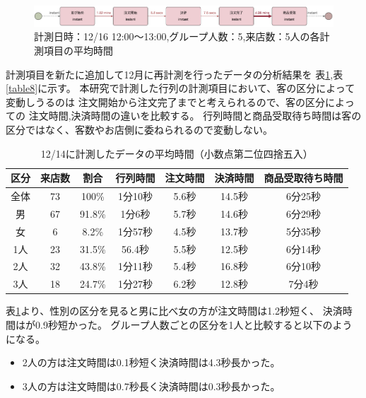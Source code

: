 \documentclass{jsarticle}
\begin{document}
\begin{figure}[H]
  \centering
  \includegraphics[width=15cm]{5-5b.png}
  \caption{計測日時：12/16 12:00〜13:00,グループ人数：5,来店数：5人の各計測項目の平均時間}
  \label{fig:5-5b}
\end{figure}





計測項目を新たに追加して12月に再計測を行ったデータの分析結果を
表\ref{table7},表\ref{table8}に示す。
本研究で計測した行列の計測項目において、客の区分によって変動しうるのは
注文開始から注文完了までと考えられるので、客の区分によっての
注文時間,決済時間の違いを比較する。
行列時間と商品受取待ち時間は客の区分ではなく、客数やお店側に委ねられるので変動しない。

\begin{table}[H]
 \begin{center}
  \caption{12/14に計測したデータの平均時間（小数点第二位四捨五入）}
    \begin{tabular}{|c|c|c|c|c|c|c|} \hline
区分 & 来店数 & 割合 & 行列時間 & 注文時間 & 決済時間 & 商品受取待ち時間 \\ \hline\hline
全体  & 73 & 100\%  & 1分10秒 & 5.6秒 & 14.5秒 & 6分25秒 \\ \hline \hline
男    & 67 & 91.8\% & 1分6秒  & 5.7秒 & 14.6秒 & 6分29秒 \\ \hline
女    & 6  & 8.2\%  & 1分57秒 & 4.5秒 & 13.7秒 & 5分35秒  \\ \hline \hline
1人   & 23 & 31.5\% & 56.4秒  & 5.5秒 & 12.5秒 & 6分14秒 \\ \hline
2人   & 32 & 43.8\% & 1分11秒 & 5.4秒 & 16.8秒 & 6分10秒 \\ \hline
3人   & 18 & 24.7\% & 1分27秒 & 6.2秒 & 12.8秒 & 7分4秒  \\ \hline
 \end{tabular}
 \label{table7}
 \end{center}
\end{table}

表\ref{table7}より、性別の区分を見ると男に比べ女の方が注文時間は1.2秒短く、
決済時間はが0.9秒短かった。
グループ人数ごとの区分を1人と比較すると以下のようになる。
\begin{itemize}
\item 2人の方は注文時間は0.1秒短く決済時間は4.3秒長かった。
\item 3人の方は注文時間は0.7秒長く決済時間は0.3秒長かった。
\end{itemize}
\end{document}
